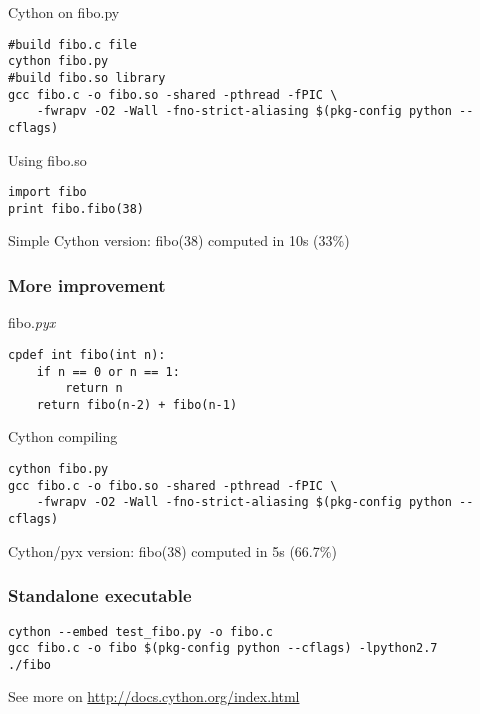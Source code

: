 \documentclass[12pt]{beamer}
\begin{document}
\begin{frame}[fragile]
  \begin{block}{Cython on fibo.py}
    \begin{verbatim}
#build fibo.c file
cython fibo.py
#build fibo.so library
gcc fibo.c -o fibo.so -shared -pthread -fPIC \
    -fwrapv -O2 -Wall -fno-strict-aliasing $(pkg-config python --cflags)
    \end{verbatim}
  \end{block}
  \begin{block}{Using fibo.so}
    \begin{verbatim}
import fibo
print fibo.fibo(38)
    \end{verbatim}
  \end{block}
  Simple Cython version: fibo(38) computed in 10s (33\%)
\end{frame}

\begin{frame}[fragile]
  \frametitle{More improvement}
    \begin{block}{fibo.\emph{pyx}}
       \begin{verbatim}
cpdef int fibo(int n):
    if n == 0 or n == 1: 
        return n
    return fibo(n-2) + fibo(n-1)
       \end{verbatim}
    \end{block}
    \begin{block}{Cython compiling}
    \begin{verbatim}
cython fibo.py
gcc fibo.c -o fibo.so -shared -pthread -fPIC \
    -fwrapv -O2 -Wall -fno-strict-aliasing $(pkg-config python --cflags)
    \end{verbatim}
  \end{block}
   Cython/pyx version: fibo(38) computed in 5s (66.7\%)
\end{frame}

\begin{frame}[fragile]
  \frametitle{Standalone executable}
  \begin{block}{}
    \begin{verbatim}
cython --embed test_fibo.py -o fibo.c
gcc fibo.c -o fibo $(pkg-config python --cflags) -lpython2.7
./fibo
    \end{verbatim}
  \end{block}
See more on \url{http://docs.cython.org/index.html}
\end{frame}
\end{document}

